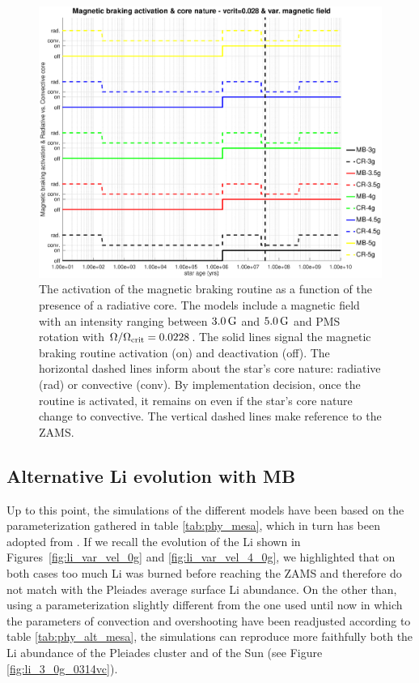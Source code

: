 \documentclass[fleqn,usenatbib]{mnras}
\begin{document}
\begin{figure}
	\includegraphics[trim = 30mm 15mm 15mm 15mm, clip,width=\columnwidth]{figures/mb_act_vc_028_var_g.eps}
    \caption{The activation of the magnetic braking routine as a function of the presence of a radiative core. The models include a magnetic field with an intensity ranging between $3.0\,\mathrm{G}$ and $5.0\,\mathrm{G}$ and PMS rotation with $\Omega / \Omega_{\mathrm{crit}}=0.0228$. The solid lines signal the magnetic braking routine activation (on) and deactivation (off). The horizontal dashed lines inform about the star's core nature: radiative (rad) or convective (conv). By implementation decision, once the routine is activated, it remains on even if the star's core nature change to convective. The vertical dashed lines make reference to the ZAMS.}
    \label{fig:mb_act_var_vel_vc_028}
\end{figure}

\subsection{Alternative Li evolution with MB}
Up to this point, the simulations of the different models have been based on the parameterization gathered in table \ref{tab:phy_mesa}, which in turn has been adopted from \citet{Choi2016}. If we recall the evolution of the Li shown in Figures~\ref{fig:li_var_vel_0g} and \ref{fig:li_var_vel_4_0g}, we highlighted that on both cases too much Li was burned before reaching the ZAMS and therefore do not match with the Pleiades average surface Li abundance. On the other than, using a parameterization slightly different from the one used until now in which the parameters of convection and overshooting have been readjusted according to table \ref{tab:phy_alt_mesa}, the simulations can reproduce more faithfully both the Li abundance of the Pleiades cluster and of the Sun (see Figure \ref{fig:li_3_0g_0314vc}).\par
\end{document}
